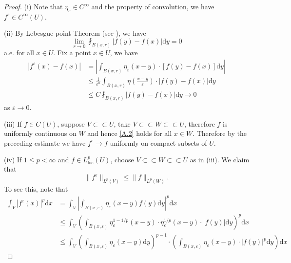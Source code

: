 \begin{proof}
(i) Note that $\eta_\varepsilon\in C^\infty$ and the property of convolution, we have $f^\varepsilon\in C^\infty(U)$.\par
(ii) By Lebesgue point Theorem (see \cite{rudin_2015_real}), we have 
\begin{equation}\label{A.2}
\lim_{r\rightarrow 0} \fint_{B\left( x,r \right)}{\left| f\left( y \right) -f\left( x \right) \right|\mathrm{d}y}=0
\end{equation}
a.e. for all $x\in U$. Fix a point $x\in U$, we have 
$$
\begin{aligned}
\left| f^{\varepsilon}\left( x \right) -f\left( x \right) \right|&=\left| \int_{B\left( x,r \right)}{\eta _{\varepsilon}\left( x-y \right) \cdot \left[ f\left( y \right) -f\left( x \right) \right] \mathrm{d}y} \right|
\\
&\le \frac{1}{\varepsilon ^n}\int_{B\left( x,r \right)}{\eta \left( \frac{x-y}{\varepsilon} \right) \cdot \left| f\left( y \right) -f\left( x \right) \right|\mathrm{d}y}
\\
&\le C\fint_{B\left( x,r \right)}{\left| f\left( y \right) -f\left( x \right) \right|\mathrm{d}y}\rightarrow 0
\end{aligned}
$$
as $\varepsilon\to 0$.\par
(iii) If $f\in C(U)$, suppose $V\subset\subset U$, take $V\subset\subset W\subset\subset U$, therefore $f$ is uniformly continuous on $W$ and hence \eqref{A.2} holds for all $x\in W$. Therefore by the preceding estimate we have $f^\varepsilon\to f$ uniformly on compact subsets of $U$.\par
(iv) If $1\le p<\infty$ and $f\in L_{\mathrm{loc}}^p(U)$, choose $V\subset\subset W\subset\subset U$ as in (iii). We claim that 
$$\|f^\varepsilon\|_{L^p(V)}\le\|f\|_{L^p(W)}.$$
To see this, note that 
$$
\begin{aligned}
\int_V{\left| f^{\varepsilon}\left( x \right) \right|^p\mathrm{d}x}&=\int_V{\left| \int_{B\left( x,\varepsilon \right)}{\eta _{\varepsilon}\left( x-y \right) f\left( y \right) \mathrm{d}y} \right|^p\mathrm{d}x}
\\
&\le \int_V{\left( \int_{B\left( x,\varepsilon \right)}{\eta _{\varepsilon}^{1-1/p}\left( x-y \right) \cdot \eta _{\varepsilon}^{1/p}\left( x-y \right) \cdot \left| f\left( y \right) \right|\mathrm{d}y} \right) ^p\mathrm{d}x}
\\
&\le \int_V{\left( \int_{B\left( x,\varepsilon \right)}{\eta _{\varepsilon}\left( x-y \right) \mathrm{d}y} \right) ^{p-1}\cdot \left( \int_{B\left( x,\varepsilon \right)}{\eta _{\varepsilon}\left( x-y \right) \cdot \left| f\left( y \right) \right|^p}\mathrm{d}y \right) \mathrm{d}x}

\end{aligned}$$
\end{proof}
